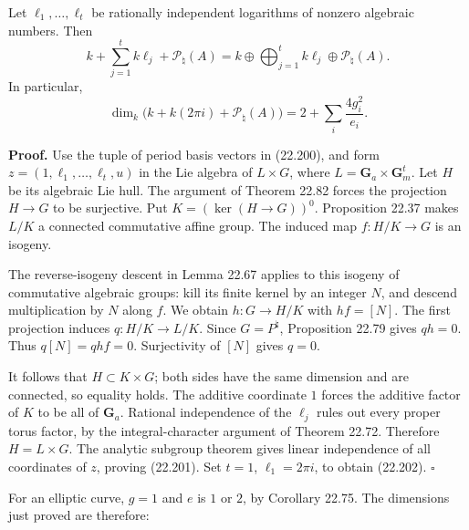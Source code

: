 \documentclass[
  11pt,
  a4paper,
]{article}
\begin{document}
Let \(\ell_1,\ldots,\ell_t\) be rationally independent logarithms of
nonzero algebraic numbers. Then \[
 k+\sum_{j=1}^t k\ell_j+\mathcal P_\natural(A)
   =k\oplus\bigoplus_{j=1}^t k\ell_j\oplus\mathcal P_\natural(A).
 \tag{22.201}
\] In particular, \[
 \dim_k\bigl(k+k(2\pi i)+\mathcal P_\natural(A)\bigr)
      =2+\sum_i\frac{4g_i^2}{e_i}.
 \tag{22.202}
\]

\textbf{Proof.} Use the tuple of period basis vectors in (22.200), and
form \(z=(1,\ell_1,\ldots,\ell_t,u)\) in the Lie algebra of
\(L\times G\), where \(L=\mathbf G_a\times\mathbf G_m^t\). Let \(H\) be
its algebraic Lie hull. The argument of Theorem 22.82 forces the
projection \(H\to G\) to be surjective. Put \(K=(\ker(H\to G))^0\).
Proposition 22.37 makes \(L/K\) a connected commutative affine group.
The induced map \(f:H/K\to G\) is an isogeny.

The reverse-isogeny descent in Lemma 22.67 applies to this isogeny of
commutative algebraic groups: kill its finite kernel by an integer
\(N\), and descend multiplication by \(N\) along \(f\). We obtain
\(h:G\to H/K\) with \(hf=[N]\). The first projection induces
\(q:H/K\to L/K\). Since \(G=P^\natural\), Proposition 22.79 gives
\(qh=0\). Thus \(q[N]=qhf=0\). Surjectivity of \([N]\) gives \(q=0\).

It follows that \(H\subset K\times G\); both sides have the same
dimension and are connected, so equality holds. The additive coordinate
\(1\) forces the additive factor of \(K\) to be all of \(\mathbf G_a\).
Rational independence of the \(\ell_j\) rules out every proper torus
factor, by the integral-character argument of Theorem 22.72. Therefore
\(H=L\times G\). The analytic subgroup theorem gives linear independence
of all coordinates of \(z\), proving (22.201). Set \(t=1\),
\(\ell_1=2\pi i\), to obtain (22.202). \(\square\)

For an elliptic curve, \(g=1\) and \(e\) is \(1\) or \(2\), by Corollary
22.75. The dimensions just proved are therefore:
\end{document}
